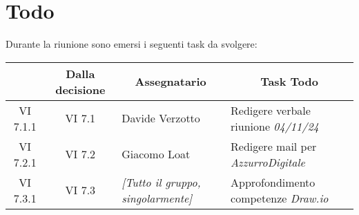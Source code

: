 

\section{Todo}

Durante la riunione sono emersi i seguenti task da svolgere:

\vspace{0.5cm}

\begin{table}[htbp]
\centering
{}
\begin{tabular}{|c|c|p{}|p{}|}
    \hline
    \rowcolor[gray]{0.75}
    \multicolumn{1}{|c|}{\textbf{Codice}} & \multicolumn{1}{|c|}{\textbf{Dalla decisione}} & \multicolumn{1}{|c|}{\textbf{Assegnatario}} & \multicolumn{1}{|c|}{\textbf{Task Todo}} \\
    \hline
    VI 7.1.1 & VI 7.1 & Davide Verzotto & Redigere verbale riunione \emph{04/11/24} \\
    \hline
    VI 7.2.1 & VI 7.2 & Giacomo Loat & Redigere mail per \emph{AzzurroDigitale} \\
    \hline
    VI 7.3.1 & VI 7.3 & \emph{[Tutto il gruppo, singolarmente]} & Approfondimento competenze \emph{Draw.io} \\
    \hline
\end{tabular}
\end{table}
